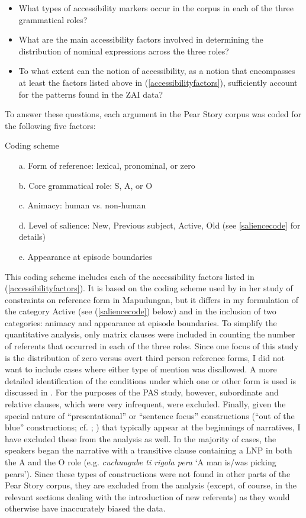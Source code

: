 \begin{itemize}

\item What types of accessibility markers occur in the corpus in each of the three grammatical roles? 
\item What are the main accessibility factors involved in determining the distribution of nominal expressions across the three roles? 
\item To what extent can the notion of accessibility, as a notion that encompasses at least the factors listed above in (\ref{accessibilityfactors}), sufficiently account for the patterns found in the ZAI data?
\end{itemize}
To answer these questions, each argument in the Pear Story corpus was coded for the following five factors:

\ea Coding scheme

\begin{itemize}
\item[a.] Form of reference: lexical, pronominal, or zero
\item[b.] Core grammatical role: S, A, or O
\item[c.] Animacy: human vs. non-human
\item[d.] Level of salience: New, Previous subject, Active, Old (see \ref{saliencecode} for details)
\item[e.] Appearance at episode boundaries
\end{itemize}
\z

This coding scheme includes each of the accessibility factors listed in (\ref{accessibilityfactors}). It is based on the coding scheme used by \citet{arnold2003} in her study of constraints on reference form in Mapudungan, but it differs in my formulation of the category Active (see (\ref{saliencecode}) below) and in the inclusion of two categories: animacy and appearance at episode boundaries. To simplify the quantitative analysis, only matrix clauses were included in counting the number of referents that occurred in each of the three roles. Since one focus of this study is the distribution of zero versus overt third person reference forms, I did not want to include cases where either type of mention was disallowed. A more detailed identification of the conditions under which one or other form is used is discussed in . For the purposes of the PAS study, however, subordinate and relative clauses, which were very infrequent, were excluded. Finally, given the special nature of ``presentational'' or ``sentence focus'' constructions (``out of the blue'' constructions; cf. ; ) that typically appear at the beginnings of narratives, I have excluded these from the analysis as well. In the majority of cases, the speakers began the narrative with a transitive clause containing a LNP in both the A and the O role (e.g. \textit{cuchuugube ti rigola pera} `A man is/was picking pears'). Since these types of constructions were not found in other parts of the Pear Story corpus, they are excluded from the analysis (except, of course, in the relevant sections dealing with the introduction of new referents) as they would otherwise have inaccurately biased the data.


